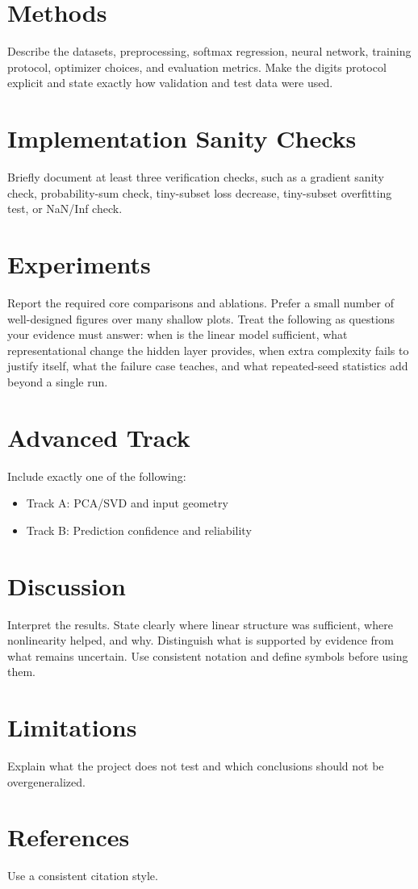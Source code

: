 \documentclass[11pt]{article}
\begin{document}
\section{Methods}
Describe the datasets, preprocessing, softmax regression, neural network, training protocol, optimizer choices, and evaluation metrics. Make the digits protocol explicit and state exactly how validation and test data were used.

\section{Implementation Sanity Checks}
Briefly document at least three verification checks, such as a gradient sanity check, probability-sum check, tiny-subset loss decrease, tiny-subset overfitting test, or NaN/Inf check.

\section{Experiments}
Report the required core comparisons and ablations. Prefer a small number of well-designed figures over many shallow plots. Treat the following as questions your evidence must answer: when is the linear model sufficient, what representational change the hidden layer provides, when extra complexity fails to justify itself, what the failure case teaches, and what repeated-seed statistics add beyond a single run.

\section{Advanced Track}
Include exactly one of the following:
\begin{itemize}[leftmargin=1.4em]
    \item Track A: PCA/SVD and input geometry
    \item Track B: Prediction confidence and reliability
\end{itemize}

\section{Discussion}
Interpret the results. State clearly where linear structure was sufficient, where nonlinearity helped, and why. Distinguish what is supported by evidence from what remains uncertain. Use consistent notation and define symbols before using them.

\section{Limitations}
Explain what the project does not test and which conclusions should not be overgeneralized.

\section*{References}
Use a consistent citation style.
\end{document}
